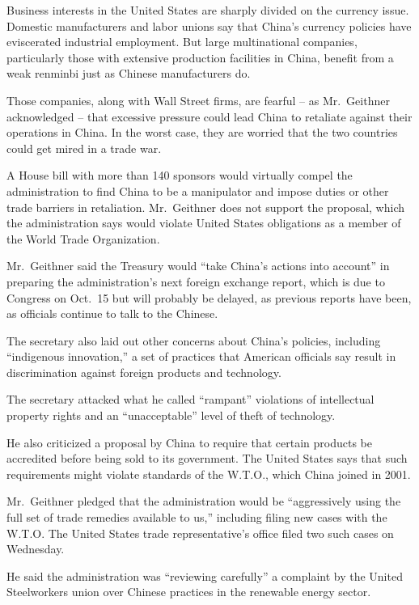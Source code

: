 ﻿\documentclass[12pt]{article}
\begin{document}
Business interests in the United States are sharply divided on the currency issue. Domestic
manufacturers and labor unions say that China's currency policies have eviscerated industrial
employment. But large multinational companies, particularly those with extensive production
facilities in China, benefit from a weak renminbi just as Chinese manufacturers do.

Those companies, along with Wall Street firms, are fearful -- as Mr.~Geithner acknowledged -- that
excessive pressure could lead China to retaliate against their operations in China. In the worst
case, they are worried that the two countries could get mired in a trade war.

A House bill with more than 140 sponsors would virtually compel the administration to find China to
be a manipulator and impose duties or other trade barriers in retaliation. Mr.~Geithner does not
support the proposal, which the administration says would violate United States obligations as a
member of the World Trade Organization.

Mr.~Geithner said the Treasury would ``take China's actions into account'' in preparing the
administration's next foreign exchange report, which is due to Congress on Oct.~15 but will probably
be delayed, as previous reports have been, as officials continue to talk to the Chinese.

The secretary also laid out other concerns about China's policies, including ``indigenous
innovation,'' a set of practices that American officials say result in discrimination against
foreign products and technology.

The secretary attacked what he called ``rampant'' violations of intellectual property rights and an
``unacceptable'' level of theft of technology.

He also criticized a proposal by China to require that certain products be accredited before being
sold to its government. The United States says that such requirements might violate standards of the
W.T.O., which China joined in 2001.

Mr.~Geithner pledged that the administration would be ``aggressively using the full set of trade
remedies available to us,'' including filing new cases with the W.T.O. The United States trade
representative's office filed two such cases on Wednesday.

He said the administration was ``reviewing carefully'' a complaint by the United Steelworkers union
over Chinese practices in the renewable energy sector.
\end{document}

